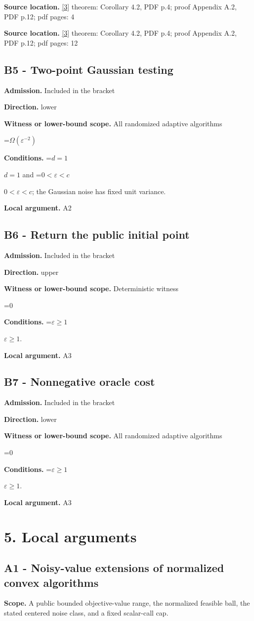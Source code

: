 \documentclass[10pt,a4paper]{article}
\newcommand{\AtlasMath}[1]{\par\begingroup\centering\setbox0=\hbox{$\displaystyle #1$}\ifdim\wd0>1.4\linewidth\typeout{ATLAS WIDE FORMULA: \the\wd0}\fi\ifdim\wd0>\linewidth\resizebox{\linewidth}{!}{\box0}\else\box0\fi\par\endgroup}
\newcommand{\AtlasInlineMath}[1]{\begingroup\setbox0=\hbox{$#1$}\ifdim\wd0>.4\linewidth\endgroup\AtlasMath{#1}\else\endgroup$#1$\fi}
\begin{document}
\textbf{Source location.} \href{https://arxiv.org/html/2607.12938v1}{[3]} theorem: Corollary 4.2, PDF p.4; proof Appendix A.2, PDF p.12; pdf pages: 4

\textbf{Source location.} \href{https://arxiv.org/html/2607.12938v1}{[3]} theorem: Corollary 4.2, PDF p.4; proof Appendix A.2, PDF p.12; pdf pages: 12

\subsection{B5 - Two-point Gaussian testing}
\textbf{Admission.} Included in the bracket

\textbf{Direction.} lower

\textbf{Witness or lower-bound scope.} All randomized adaptive algorithms

\AtlasMath{\Omega(\varepsilon^{-2})}
\textbf{Conditions.} \AtlasInlineMath{d=1} and \AtlasInlineMath{0<\varepsilon<c}; the Gaussian noise has fixed unit variance.

\textbf{Local argument.} A2

\subsection{B6 - Return the public initial point}
\textbf{Admission.} Included in the bracket

\textbf{Direction.} upper

\textbf{Witness or lower-bound scope.} Deterministic witness

\AtlasMath{0}
\textbf{Conditions.} \AtlasInlineMath{\varepsilon\ge 1}.

\textbf{Local argument.} A3

\subsection{B7 - Nonnegative oracle cost}
\textbf{Admission.} Included in the bracket

\textbf{Direction.} lower

\textbf{Witness or lower-bound scope.} All randomized adaptive algorithms

\AtlasMath{0}
\textbf{Conditions.} \AtlasInlineMath{\varepsilon\ge 1}.

\textbf{Local argument.} A3

\section{5. Local arguments}
\subsection{A1 - Noisy-value extensions of normalized convex algorithms}
\textbf{Scope.} A public bounded objective-value range, the normalized feasible ball, the stated centered noise class, and a fixed scalar-call cap.
\end{document}
